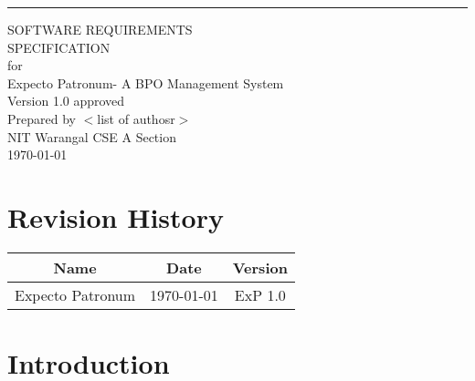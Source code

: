 \documentclass{scrreprt}
\date{}
\def\myversion{1.0 }
\begin{document}
\begin{flushright}
    \rule{16cm}{5pt}\vskip1cm
    \begin{bfseries}
        \Huge{SOFTWARE REQUIREMENTS\\ SPECIFICATION}\\
        \vspace{1.5cm}
        for\\
        \vspace{1.5cm}
        \Huge{Expecto Patronum- A BPO Management System}\\
        \vspace{1.9cm}
        \LARGE{Version \myversion approved}\\
        \vspace{1.9cm}
        Prepared by $<$list of authosr$>$\\
        \vspace{1.9cm}
        NIT Warangal CSE A Section\\
        \vspace{1.9cm}
        \today\\
    \end{bfseries}
\end{flushright}

\tableofcontents

\chapter*{Revision History}
 
\begin{center}
    \begin{tabular}{|c|c|c|}
        \hline
	    Name & Date & Version\\
        \hline
	    Expecto Patronum & \today & ExP 1.0\\
        \hline
    \end{tabular}
\end{center}


\chapter{Introduction}
\end{document}
